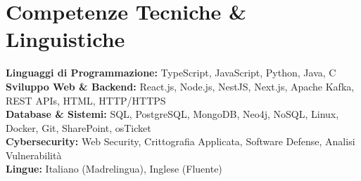 \section{Competenze Tecniche \& Linguistiche}
\vspace{2pt}
\noindent\small
\textbf{Linguaggi di Programmazione: } TypeScript, JavaScript, Python, Java, C\\[2pt]
\textbf{Sviluppo Web \& Backend: } React.js, Node.js, NestJS, Next.js, Apache Kafka, REST APIs, HTML, HTTP/HTTPS\\[2pt]
\textbf{Database \& Sistemi: } SQL, PostgreSQL, MongoDB, Neo4j, NoSQL, Linux, Docker, Git, SharePoint, osTicket\\[2pt]
\textbf{Cybersecurity: } Web Security, Crittografia Applicata, Software Defense, Analisi Vulnerabilità\\[2pt]
\textbf{Lingue: } Italiano (Madrelingua), Inglese (Fluente)
